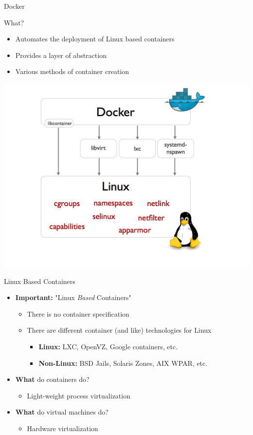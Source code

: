\documentclass[xcolor=svgnames,handout]{beamer}
\begin{document}
\begin{frame}{Docker}
  \begin{block}{What?}
  \begin{itemize}
      \item Automates the deployment of Linux based containers
      \item Provides a layer of abstraction
      \item Various methods of container creation
  \end{itemize}
  \end{block}
  \begin{center}
    \includegraphics[width=.7\textwidth]{docker-abstraction.png}
  \end{center}
\end{frame}

\begin{frame}{Linux Based Containers}
  \begin{itemize}
    \item \textbf{Important:} "Linux \textit{Based} Containers"
      \begin{itemize}
        \item There is no container specification
        \item There are different container (and like) technologies for Linux
      	\begin{itemize}
        	\item \textbf{Linux:} LXC, OpenVZ,  Google containers, etc.
        	\item \textbf{Non-Linux:} BSD Jails, Solaris Zones, AIX WPAR, etc.
      	\end{itemize}
      \end{itemize}
    \item \textbf{What} do containers do?
      \begin{itemize}
        \item Light-weight process virtualization
      \end{itemize}
    \item \textbf{What} do virtual machines do?
      \begin{itemize}
        \item Hardware virtualization
      \end{itemize}
  \end{itemize}
\end{frame}
\end{document}
